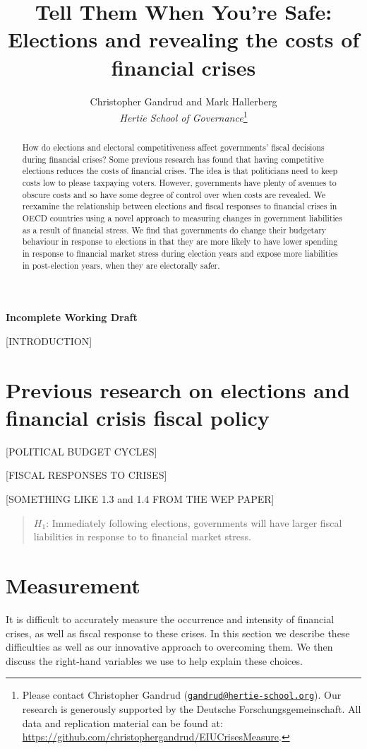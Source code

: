 \documentclass[]{article}
\title{Tell Them When You're Safe: Elections and revealing the costs of financial crises}
\author{Christopher Gandrud and Mark Hallerberg \\ \emph{Hertie School of Governance}\footnote{Please contact Christopher Gandrud
(\href{mailto:gandrud@hertie-school.org}{\nolinkurl{gandrud@hertie-school.org}}).
Our research is generously supported by the Deutsche Forschungsgemeinschaft.
All data and replication material can be found at:
\url{https://github.com/christophergandrud/EIUCrisesMeasure}.}}
\begin{document}
\maketitle


\textbf{Incomplete Working Draft}

\begin{abstract}
How do elections and electoral competitiveness affect governments' fiscal decisions during financial crises? Some previous research has found that having competitive elections reduces the costs of financial crises. The idea is that politicians need to keep costs low to please taxpaying voters. However, governments have plenty of avenues to obscure costs and so have some degree of control over when costs are revealed. We reexamine the relationship between elections and fiscal responses to financial crises in OECD countries using a novel approach to measuring changes in government liabilities as a result of financial stress. We find that governments do change their budgetary behaviour in response to elections in that they are more likely to have lower spending in response to financial market stress during election years and expose more liabilities in post-election years, when they are electorally safer.

\end{abstract}

[INTRODUCTION]

\section{Previous research on elections and financial crisis fiscal policy}

[POLITICAL BUDGET CYCLES]

[FISCAL RESPONSES TO CRISES]

[SOMETHING LIKE 1.3 and 1.4 FROM THE WEP PAPER]

\begin{quote}
        $H_{1}$: Immediately following elections, governments will have larger fiscal liabilities in response to to financial market stress.
\end{quote}

\section{Measurement}

It is difficult to accurately measure the occurrence and intensity of financial crises, as well as fiscal response to these crises. In this section we describe these difficulties as well as our innovative approach to overcoming them. We then discuss the right-hand variables we use to help explain these choices.
\end{document}
